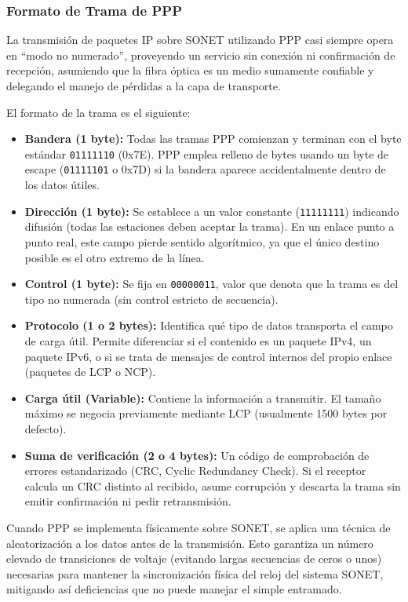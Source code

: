 \subsubsection{Formato de Trama de PPP}

La transmisión de paquetes IP sobre SONET utilizando PPP  casi siempre opera en ``modo no numerado'', proveyendo un servicio sin conexión ni confirmación de recepción, asumiendo que la fibra óptica es un medio sumamente confiable y delegando el manejo de pérdidas a la capa de transporte.

El formato de la trama es el siguiente:
\begin{itemize}
    \item \textbf{Bandera (1 byte):} Todas las tramas PPP comienzan y terminan con el byte estándar \texttt{01111110} (0x7E). PPP emplea relleno de bytes usando un byte de escape (\texttt{01111101} o 0x7D) si la bandera aparece accidentalmente dentro de los datos útiles.
    \item \textbf{Dirección (1 byte):} Se establece a un valor constante (\texttt{11111111}) indicando difusión (todas las estaciones deben aceptar la trama). En un enlace punto a punto real, este campo pierde sentido algorítmico, ya que el único destino posible es el otro extremo de la línea.
    \item \textbf{Control (1 byte):} Se fija en \texttt{00000011}, valor que denota que la trama es del tipo no numerada (sin control estricto de secuencia).
    \item \textbf{Protocolo (1 o 2 bytes):} Identifica qué tipo de datos transporta el campo de carga útil. Permite diferenciar si el contenido es un paquete IPv4, un paquete IPv6, o si se trata de mensajes de control internos del propio enlace (paquetes de LCP o NCP).
    \item \textbf{Carga útil (Variable):} Contiene la información a transmitir. El tamaño máximo se negocia previamente mediante LCP (usualmente 1500 bytes por defecto).
    \item \textbf{Suma de verificación (2 o 4 bytes):} Un código de comprobación de errores estandarizado (CRC, Cyclic Redundancy Check). Si el receptor calcula un CRC distinto al recibido, asume corrupción y descarta la trama sin emitir confirmación ni pedir retransmisión.
\end{itemize}

Cuando PPP se implementa físicamente sobre SONET, se aplica una técnica de aleatorización a los datos antes de la transmisión. Esto garantiza un número elevado de transiciones de voltaje (evitando largas secuencias de ceros o unos) necesarias para mantener la sincronización física del reloj del sistema SONET, mitigando así deficiencias que no puede manejar el simple entramado.


